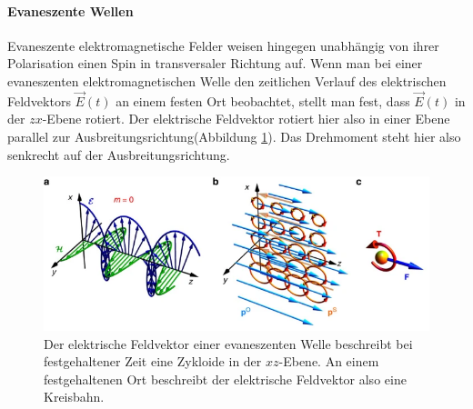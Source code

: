 \documentclass[titlepage]{article}
\begin{document}
	\paragraph{Evaneszente Wellen}	
	Evaneszente elektromagnetische Felder weisen hingegen unabhängig von ihrer Polarisation einen Spin in transversaler Richtung auf. Wenn man bei einer evaneszenten elektromagnetischen Welle den zeitlichen Verlauf des elektrischen Feldvektors $\vec{E}(t)$ an einem festen Ort beobachtet, stellt man fest, dass $\vec{E}(t)$ in der $zx$-Ebene rotiert. Der elektrische Feldvektor rotiert hier also in einer Ebene parallel zur Ausbreitungsrichtung(Abbildung \ref{fig:ev_spin}). Das Drehmoment steht hier also senkrecht auf der Ausbreitungsrichtung. \cite{Bliokh.2014}	
	
	\begin{figure}[h]
		\centering
		\includegraphics[width=0.7\linewidth]{figures/spin/ev_spin}
		\caption[Spin evaneszente EM-Welle]{Der elektrische Feldvektor einer evaneszenten Welle beschreibt bei festgehaltener Zeit eine Zykloide in der $xz$-Ebene. An einem festgehaltenen Ort beschreibt der elektrische Feldvektor also eine Kreisbahn.}
		\label{fig:ev_spin}
	\end{figure}
\end{document}
